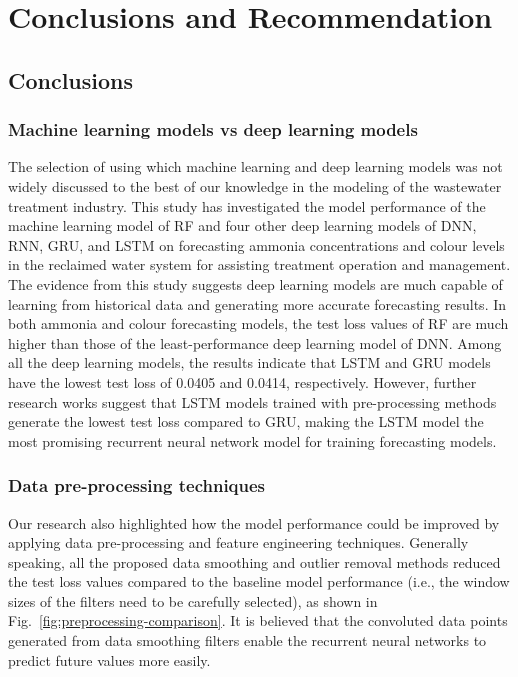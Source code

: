\chapter{Conclusions and Recommendation}
\section{Conclusions}
\subsection{Machine learning models vs deep learning models}
The selection of using which machine learning and deep learning models was not widely discussed to the best of our knowledge in the modeling of the wastewater treatment industry. This study has investigated the model performance of the machine learning model of RF and four other deep learning models of DNN, RNN, GRU, and LSTM on forecasting ammonia concentrations and colour levels in the reclaimed water system for assisting treatment operation and management. The evidence from this study suggests deep learning models are much capable of learning from historical data and generating more accurate forecasting results. In both ammonia and colour forecasting models, the test loss values of RF are much higher than those of the least-performance deep learning model of DNN. Among all the deep learning models, the results indicate that LSTM and GRU models have the lowest test loss of 0.0405 and 0.0414, respectively. However, further research works suggest that LSTM models trained with pre-processing methods generate the lowest test loss compared to GRU, making the LSTM model the most promising recurrent neural network model for training forecasting models.

\subsection{Data pre-processing techniques}
Our research also highlighted how the model performance could be improved by applying data pre-processing and feature engineering techniques. Generally speaking, all the proposed data smoothing and outlier removal methods reduced the test loss values compared to the baseline model performance (i.e., the window sizes of the filters need to be carefully selected), as shown in Fig.~\ref{fig:preprocessing-comparison}. It is believed that the convoluted data points generated from data smoothing filters enable the recurrent neural networks to predict future values more easily.

